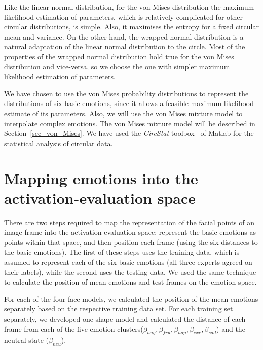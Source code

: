 \documentclass[10pt,journal,cspaper,compsoc]{IEEEtran}
\begin{document}
Like the linear normal distribution, for the von Mises distribution the maximum likelihood estimation of parameters, which is relatively complicated for other circular distributions, is simple. Also, it maximises the entropy for a fixed circular mean and variance. On the other hand, the wrapped normal distribution is a natural adaptation of the linear normal distribution to the circle. Most of the properties of the wrapped normal distribution hold true for the von Mises distribution and vice-versa, so we choose the one with simpler maximum likelihood estimation of parameters.

We have chosen to use the von Mises probability distributions to represent the distributions of six basic emotions, since it allows a feasible maximum likelihood estimate of its parameters. Also, we will use the von Mises mixture model to interpolate complex emotions. The von Mises mixture model will be described in Section~\ref{sec_von_Mises}. We have used the \emph{CircStat} toolbox~\cite{berens2009circstat} of Matlab for the statistical analysis of circular data.


\section{Mapping emotions into the activation-evaluation space}
\label{sec_mapping}

There are two steps required to map the representation of the facial points of an image frame into the activation-evaluation space: represent the basic emotions as points within that space, and then position each frame (using the six distances to the basic emotions). The first of these steps uses the training data, which is assumed to represent each of the six basic emotions (all three experts agreed on their labels), while the second uses the testing data. We used the same technique to calculate the position of mean emotions and test frames on the emotion-space.

For each of the four face models, we calculated the position of the mean emotions separately based on the respective training data set. For each training set separately, we developed one shape model and calculated the distance of each frame from each of the five emotion clusters($\beta_{ang}, \beta_{fru}, \beta_{hap}, \beta_{exc}, \beta_{sad}$) and the neutral state ($\beta_{neu}$). 
\end{document}
